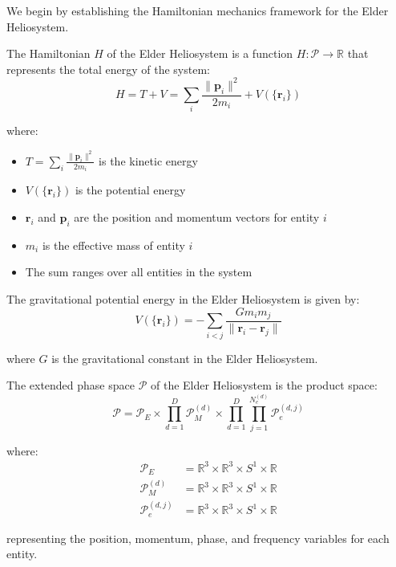 We begin by establishing the Hamiltonian mechanics framework for the Elder Heliosystem.

\begin{definition}
The Hamiltonian $H$ of the Elder Heliosystem is a function $H: \mathcal{P} \to \mathbb{R}$ that represents the total energy of the system:
\begin{equation}
H = T + V = \sum_{i} \frac{\|\mathbf{p}_i\|^2}{2m_i} + V(\{\mathbf{r}_i\})
\end{equation}

where:
\begin{itemize}
    \item $T = \sum_{i} \frac{\|\mathbf{p}_i\|^2}{2m_i}$ is the kinetic energy
    \item $V(\{\mathbf{r}_i\})$ is the potential energy
    \item $\mathbf{r}_i$ and $\mathbf{p}_i$ are the position and momentum vectors for entity $i$
    \item $m_i$ is the effective mass of entity $i$
    \item The sum ranges over all entities in the system
\end{itemize}
\end{definition}

\begin{definition}
The gravitational potential energy in the Elder Heliosystem is given by:
\begin{equation}
V(\{\mathbf{r}_i\}) = -\sum_{i < j} \frac{G m_i m_j}{\|\mathbf{r}_i - \mathbf{r}_j\|}
\end{equation}

where $G$ is the gravitational constant in the Elder Heliosystem.
\end{definition}

\begin{definition}
The extended phase space $\mathcal{P}$ of the Elder Heliosystem is the product space:
\begin{equation}
\mathcal{P} = \mathcal{P}_E \times \prod_{d=1}^D \mathcal{P}_M^{(d)} \times \prod_{d=1}^D \prod_{j=1}^{N_e^{(d)}} \mathcal{P}_e^{(d,j)}
\end{equation}

where:
\begin{align}
\mathcal{P}_E &= \mathbb{R}^3 \times \mathbb{R}^3 \times S^1 \times \mathbb{R} \\
\mathcal{P}_M^{(d)} &= \mathbb{R}^3 \times \mathbb{R}^3 \times S^1 \times \mathbb{R} \\
\mathcal{P}_e^{(d,j)} &= \mathbb{R}^3 \times \mathbb{R}^3 \times S^1 \times \mathbb{R}
\end{align}

representing the position, momentum, phase, and frequency variables for each entity.
\end{definition}

